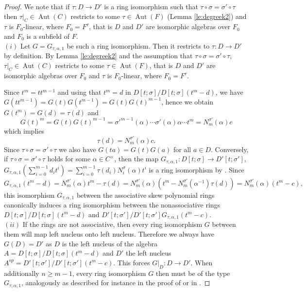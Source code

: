 \documentclass{amsart}
\theoremstyle{plain}
\theoremstyle{definition}
\numberwithin{equation}{section}
\numberwithin{figure}{section}
\DeclareMathOperator{\Aut}{Aut}
\begin{document}
\begin{proof}
We note that if $\tau:D\to D'$ is a ring isomorphism such that $\tau\circ\sigma=\sigma'\circ \tau$ then $\tau|_C\in \Aut(C)$  restricts to some $\tau\in \Aut(F)$ (Lemma \ref{le:degreek2}) and $\tau$ is  $F_0$-linear, where $F_0=F^\tau$, that is $D$ and $D'$ are isomorphic algebras over $F_0$ and $F_0$ is a subfield of $F$.
\\ $(i)$ Let $ G= G_{\tau,\alpha,1}$ be such a ring isomorphism. Then it restricts to $\tau:D\to D'$ by definition. By Lemma \ref{le:degreek2} and the assumption that $\tau\circ\sigma=\sigma'\circ \tau$,
  $\tau|_C\in \Aut(C)$  restricts to some $\tau\in \Aut(F)$, that is $D$ and $D'$ are isomorphic algebras over $F_0$ and $\tau$ is  $F_0$-linear, where $F_0=F^\tau$.

 Since $t^m=t t^{m-1}$ and using that $t^m=d$ in $D[t;\sigma]/D[t;\sigma](t^m-d)$, we have $G(t t^{m-1})=G(t)G(t^{m-1})=G(t)G(t)^{m-1}$, hence we obtain
$G(t^m) = G(d)=\tau(d)$
and
$$
G(t)^m =G(t)G(t)^{m-1}= {\sigma'}^{m-1}(\alpha) \cdots \sigma'(\alpha) \alpha\cdots t^{m} =
N^{\sigma'}_{m}(\alpha)c
$$
 which implies
$$\tau(d) =  N^{\sigma'}_{m}(\alpha) c.$$
Since $\tau\circ\sigma=\sigma'\circ \tau$ we also have $G(ta)=G(t)G(a)$ for all $a\in D$.
Conversely,  if $\tau\circ\sigma=\sigma'\circ \tau$ 
holds
for  some $\alpha\in C^\times$, then the map
$G_{\tau,\alpha,1}:D[t;\sigma]\to D'[t;\sigma']$, $G_{\tau,\alpha,1}(\sum_{i=0}^{{m-1}}d_it^i)=\sum_{i=0}^{m-1}\tau(d_i) N_i^\sigma(\alpha) t^i$  is a
ring isomorphism by \cite[Theorem 3]{Rimmer1978}. Since
$$
G_{\tau,\alpha,1}(t^m-d)=N_m^{\sigma'}(\alpha)t^m- \tau(d)=N_m^{\sigma'}(\alpha)(t^m-N_m^{\sigma'}(\alpha^{-1})\tau(d))=N_m^{\sigma'}(\alpha)(t^m-c),
$$
 this isomorphism $G_{\tau,\alpha,1}$ between the associative skew polynomial rings  canonically induces a ring isomorphism between the nonassociative rings $D[t;\sigma]/D[t;\sigma](t^m-d)$ and $D'[t;\sigma']/D'[t;\sigma']G_{\tau,\alpha,1}(t^m-c)$.
\\ $(ii)$ If the rings are not associative, then every ring isomorphism $G$ between them will map left nucleus onto left nucleus.
 Therefore we always have $G(D)=D'$ as $D$ is the left nucleus  of the algebra $A=D[t;\sigma]/D[t;\sigma](t^m-d)$ and
 $D'$ the left nucleus $A^{op}=D'[t;\sigma']/D'[t;\sigma'](t^m-c)$.
 This forces $G|_D:D\to D'$.  When additionally $n\geq m-1$,  every ring isomorphism $G$ then must be
  of the type $ G_{\tau,\alpha,1}$, analogously as described for instance in the proof of \cite[Theorem 4.2]{Pum2025} or in   \cite{BP}.
\end{proof}
\end{document}
